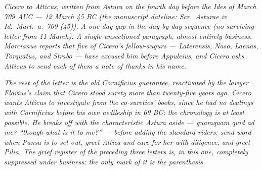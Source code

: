
\textit{Cicero to Atticus, written from Astura on the
fourth day before the Ides of March 709 AUC --- 12
March 45 BC (the manuscript dateline: \textit{Scr.\
Asturae iv Id.\ Mart.\ a.\ 709 (45)}). A one-day gap
in the day-by-day sequence (no surviving letter from
11 March). A single unsectioned paragraph, almost
entirely business. Marcianus reports that five of
Cicero's fellow-augurs --- Laterensis, Naso, Laenas,
Torquatus, and Strabo --- have excused him before
Appuleius, and Cicero asks Atticus to send each of
them a note of thanks in his name.}

\textit{The rest of the letter is the old Cornificius
guarantee, reactivated by the lawyer Flavius's claim
that Cicero stood surety more than twenty-five years
ago. Cicero wants Atticus to investigate from the
co-sureties' books, since he had no dealings with
Cornificius before his own aedileship in 69 BC; the
chronology is at least possible. He breaks off with
the characteristic Astura aside --- \textit{quamquam
quid ad me?} ``though what is it to me?'' --- before
adding the standard riders: send word when Pansa is
to set out, greet Attica and care for her with
diligence, and greet Pilia. The grief register of the
preceding three letters is, in this one, completely
suppressed under business: the only mark of it is the
parenthesis.}
